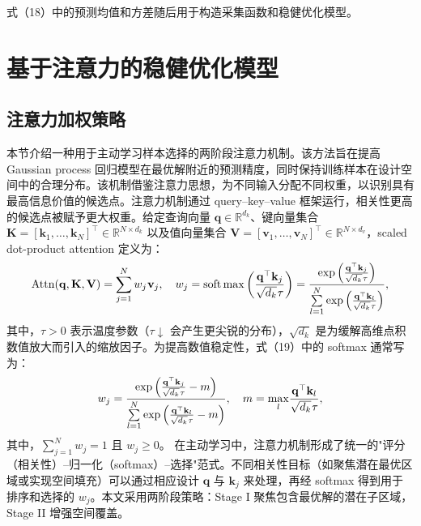\documentclass[]{interact}
\theoremstyle{plain}%
\theoremstyle{definition}
\theoremstyle{remark}
\begin{document}
式（18）中的预测均值和方差随后用于构造采集函数和稳健优化模型。

\section{基于注意力的稳健优化模型}
\subsection{注意力加权策略}
本节介绍一种用于主动学习样本选择的两阶段注意力机制。该方法旨在提高 Gaussian process 回归模型在最优解附近的预测精度，同时保持训练样本在设计空间中的合理分布。该机制借鉴注意力思想，为不同输入分配不同权重，以识别具有最高信息价值的候选点。注意力机制通过 query--key--value 框架运行，相关性更高的候选点被赋予更大权重。给定查询向量 $\mathbf{q} \in \mathbb{R}^{d_k}$、键向量集合 $\mathbf{K} = [\mathbf{k}_1, \ldots, \mathbf{k}_N]^\top \in \mathbb{R}^{N \times d_k}$ 以及值向量集合 $\mathbf{V}=[\mathbf{v}_1,\ldots,\mathbf{v}_N]^\top\in\mathbb{R}^{N\times d_v}$，scaled dot-product attention 定义为：
\begin{equation}
	{\rm{Attn}}({\bf{q}},{\bf{K}},{\bf{V}}) = \sum\limits_{j = 1}^N {{w_j}} {\mkern 1mu} {{\bf{v}}_j},\quad {w_j} = {\rm{soft}}\max \left( {\frac{{{{\bf{q}}^ \top }{{\bf{k}}_j}}}{{\sqrt {{d_k}} {\mkern 1mu} \tau }}} \right) = \frac{{\exp \left( {\frac{{{{\bf{q}}^ \top }{{\bf{k}}_j}}}{{\sqrt {{d_k}} {\mkern 1mu} \tau }}} \right)}}{{\sum\limits_{l = 1}^N {\exp } \left( {\frac{{{{\bf{q}}^ \top }{{\bf{k}}_l}}}{{\sqrt {{d_k}} {\mkern 1mu} \tau }}} \right)}},
\end{equation}
其中，$\tau > 0$ 表示温度参数（$\tau \downarrow$ 会产生更尖锐的分布），$\sqrt{d_{k}}$ 是为缓解高维点积数值放大而引入的缩放因子。为提高数值稳定性，式（19）中的 softmax 通常写为：
\begin{equation}
	{w_j} = \frac{{\exp \left( {\frac{{{{\bf{q}}^ \top }{{\bf{k}}_j}}}{{\sqrt {{d_k}} {\mkern 1mu} \tau }} - m} \right)}}{{\sum\limits_{l = 1}^N {\exp } \left( {\frac{{{{\bf{q}}^ \top }{{\bf{k}}_l}}}{{\sqrt {{d_k}} {\mkern 1mu} \tau }} - m} \right)}},\quad m = {\max _l}\frac{{{{\bf{q}}^ \top }{{\bf{k}}_l}}}{{\sqrt {{d_k}} {\mkern 1mu} \tau }},
\end{equation}
其中，$\sum_{j=1}^{N}w_j=1$ 且 $w_j\ge 0$。
在主动学习中，注意力机制形成了统一的"评分（相关性）--归一化（softmax）--选择"范式。不同相关性目标（如聚焦潜在最优区域或实现空间填充）可以通过相应设计 $\mathbf{q}$ 与 $\mathbf{k}_j$ 来处理，再经 softmax 得到用于排序和选择的 $w_j$。本文采用两阶段策略：Stage I 聚焦包含最优解的潜在子区域，Stage II 增强空间覆盖。
\end{document}

